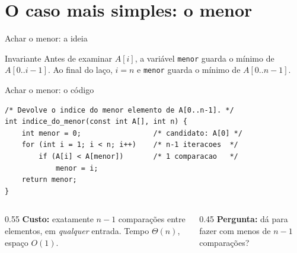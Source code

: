 \documentclass[aspectratio=169]{beamer}
\begin{document}
\section{O caso mais simples: o menor}

\begin{frame}{Achar o menor: a ideia}
  \begin{center}
  \end{center}

  \begin{block}{Invariante}
    Antes de examinar $A[i]$, a variável \texttt{menor} guarda o mínimo de
    $A[0..i-1]$. Ao final do laço, $i = n$ e \texttt{menor} guarda o mínimo de
    $A[0..n-1]$.
  \end{block}
\end{frame}

\begin{frame}[fragile]{Achar o menor: o código}
\begin{lstlisting}
/* Devolve o indice do menor elemento de A[0..n-1]. */
int indice_do_menor(const int A[], int n) {
    int menor = 0;                 /* candidato: A[0] */
    for (int i = 1; i < n; i++)    /* n-1 iteracoes  */
        if (A[i] < A[menor])       /* 1 comparacao   */
            menor = i;
    return menor;
}
\end{lstlisting}

  \begin{columns}[T]
    \begin{column}{0.55\textwidth}
      \textbf{Custo:} exatamente $n-1$ comparações entre elementos, em
      \emph{qualquer} entrada. Tempo $\Theta(n)$, espaço $O(1)$.
    \end{column}
    \begin{column}{0.45\textwidth}
      \textbf{Pergunta:} dá para fazer com menos de $n-1$ comparações?
    \end{column}
  \end{columns}
\end{frame}
\end{document}
